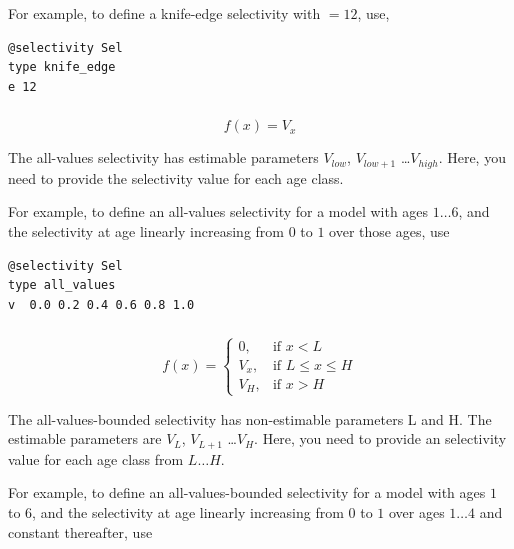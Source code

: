 For example, to define a knife-edge selectivity with $=12$, use,

{\small{\begin{verbatim}
@selectivity Sel
type knife_edge
e 12
\end{verbatim}}}

\subsubsection[All-values]{}

\begin{equation}
f(x)=V_x
\end{equation}

The all-values selectivity has estimable parameters $V_{low}$, $V_{low+1}$ \ldots $V_{high}$. Here, you need to provide the selectivity value for each age class.

For example, to define an all-values selectivity for a model with ages $1 \ldots 6$, and the selectivity at age linearly increasing from $0$ to $1$ over those ages, use

{\small{\begin{verbatim}
@selectivity Sel
type all_values
v  0.0 0.2 0.4 0.6 0.8 1.0
\end{verbatim}}}

\subsubsection[All-values-bounded]{}

\begin{equation}
f(x)=\begin{cases}
		 0, & \text{if $x < L$} \\
		 V_x, & \text{if $L \le x \le H$} \\
		 V_H, & \text{if $x > H$}
  \end{cases}
\end{equation}

The all-values-bounded selectivity has non-estimable parameters L and H. The estimable parameters are $V_L$, $V_{L+1}$ \ldots $V_H$. Here, you need to provide an selectivity value for each age class from $L \ldots H$.

For example, to define an all-values-bounded selectivity for a model with ages $1$ to $6$, and the selectivity at age linearly increasing from $0$ to $1$ over ages $1 \ldots 4$ and constant thereafter, use

